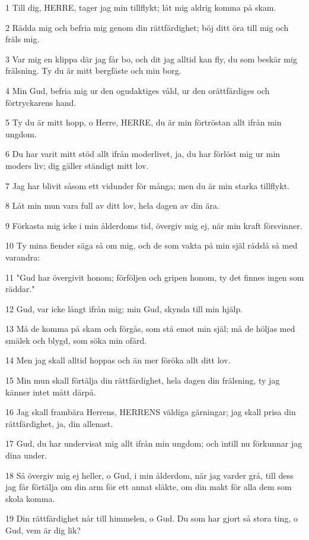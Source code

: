 \par 1 Till dig, HERRE, tager jag min tillflykt; låt mig aldrig komma på skam.
\par 2 Rädda mig och befria mig genom din rättfärdighet; böj ditt öra till mig och fräls mig.
\par 3 Var mig en klippa där jag får bo, och dit jag alltid kan fly, du som beskär mig frälsning. Ty du är mitt bergfäste och min borg.
\par 4 Min Gud, befria mig ur den ogudaktiges våld, ur den orättfärdiges och förtryckarens hand.
\par 5 Ty du är mitt hopp, o Herre, HERRE, du är min förtröstan allt ifrån min ungdom.
\par 6 Du har varit mitt stöd allt ifrån moderlivet, ja, du har förlöst mig ur min moders liv; dig gäller ständigt mitt lov.
\par 7 Jag har blivit såsom ett vidunder för många; men du är min starka tillflykt.
\par 8 Låt min mun vara full av ditt lov, hela dagen av din ära.
\par 9 Förkasta mig icke i min ålderdoms tid, övergiv mig ej, när min kraft försvinner.
\par 10 Ty mina fiender säga så om mig, och de som vakta på min själ rådslå så med varandra:
\par 11 "Gud har övergivit honom; förföljen och gripen honom, ty det finnes ingen som räddar."
\par 12 Gud, var icke långt ifrån mig; min Gud, skynda till min hjälp.
\par 13 Må de komma på skam och förgås, som stå emot min själ; må de höljas med smälek och blygd, som söka min ofärd.
\par 14 Men jag skall alltid hoppas och än mer föröka allt ditt lov.
\par 15 Min mun skall förtälja din rättfärdighet, hela dagen din frälsning, ty jag känner intet mått därpå.
\par 16 Jag skall frambära Herrens, HERRENS väldiga gärningar; jag skall prisa din rättfärdighet, ja, din allenast.
\par 17 Gud, du har undervisat mig allt ifrån min ungdom; och intill nu förkunnar jag dina under.
\par 18 Så övergiv mig ej heller, o Gud, i min ålderdom, när jag varder grå, till dess jag får förtälja om din arm för ett annat släkte, om din makt för alla dem som skola komma.
\par 19 Din rättfärdighet når till himmelen, o Gud. Du som har gjort så stora ting, o Gud, vem är dig lik?
